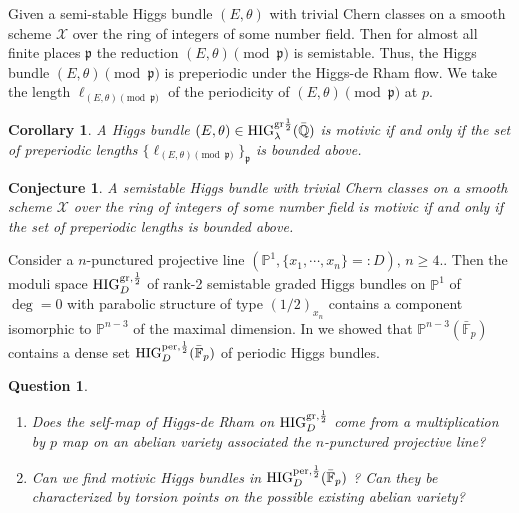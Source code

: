 \documentclass[12pt,twoside]{book}
\theoremstyle{plain}
\newtheorem{question}[question]{Question}
\newtheorem{conjecture}[conjecture]{Conjecture}
\newtheorem{corollary}[corollary]{Corollary}
\theoremstyle{definition}
\theoremstyle{remark}
\newcommand{\frakp}{{\mathfrak p}}
\numberwithin{equation}{section}
\begin{document}
Given a semi-stable Higgs bundle $(E,\theta)$ with trivial Chern classes on a smooth scheme $\mathcal X$ over the ring of integers of some number field. Then for almost all finite places $\frakp$ the reduction $(E, \theta)\pmod{\frakp}$ is semistable. Thus, the Higgs bundle $(E, \theta)\pmod{\frakp}$ is preperiodic under the Higgs-de Rham flow. We take the length $\ell_{(E, \theta)\pmod{\frakp}}$ of the periodicity of $(E, \theta)\pmod{\frakp}$ at $p$.
\begin{corollary}
A Higgs bundle $(E,\theta)\in \text{HIG}^{\text{gr} {1\over 2}}_\lambda (\bar{\mathbb Q})$ is motivic if and only if
the set of preperiodic lengths $\{ \ell_{(E, \theta)\pmod{\frakp}} \}_{\frakp}$ is bounded above.
\end{corollary}
\begin{conjecture} A semistable Higgs bundle with trivial Chern classes on a smooth scheme $\mathcal X$ over the ring of integers of some number field is motivic if and only if the set of preperiodic lengths is bounded above.
\end{conjecture}
Consider a $n$-punctured projective line $(\mathbb P^1, \{x_1,\cdots, x_n\}=:D),\, n\geq 4$.. Then the moduli space
$\text{HIG}_D^{\text{gr}, {1\over 2}}$ of rank-2 semistable graded Higgs bundles on $\mathbb P^1$ of $\deg=0$ with parabolic structure of type $(1/2)_{x_n}$ contains a component  isomorphic to $\mathbb P^{n-3}$ of the maximal dimension. 
In \cite{SYZ22} we showed that $\mathbb P^{n-3}(\bar {\mathbb F}_p)$ contains a dense set $\text{HIG}_D^{\text{per}, {1\over 2}}( \bar {\mathbb F}_p)$ of periodic Higgs bundles.
\begin{question}
\begin{enumerate}
\item Does the self-map of Higgs-de Rham on $\text{HIG}_D^{\text{gr}, {1\over 2}}$  come from a multiplication by $p$ map on an abelian variety associated the $n$-punctured projective line?
\item Can we find motivic Higgs bundles in $\text{HIG}_D^{\text{per}, {1\over 2}}( \bar {\mathbb F}_p)$ ?
Can they be characterized by torsion points on the possible existing abelian variety?
\end{enumerate}
\end{question}
\end{document}
